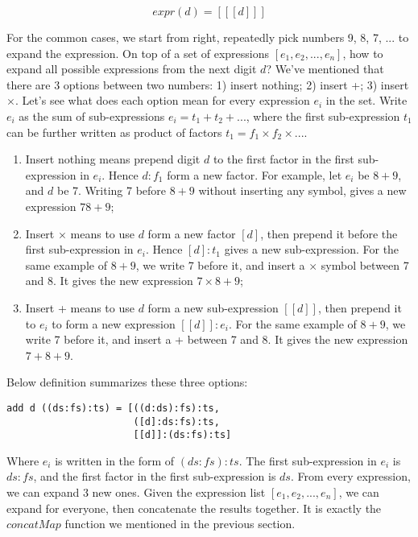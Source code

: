 \documentclass{article}
\begin{document}
\[
expr(d) = [[[d]]]
\]

For the common cases, we start from right, repeatedly pick numbers 9, 8, 7, ... to expand the expression. On top of a set of expressions $[e_1, e_2, ..., e_n]$, how to expand all possible expressions from the next digit $d$? We've mentioned that there are 3 options between two numbers: 1) insert nothing; 2) insert +; 3) insert $\times$. Let's see what does each option mean for every expression $e_i$ in the set. Write $e_i$ as the sum of sub-expressions $e_i = t_1 + t_2 + ...$, where the first sub-expression $t_1$ can be further written as product of factors $t_1 = f_1 \times f_2 \times ...$.

\begin{enumerate}
\item Insert nothing means prepend digit $d$ to the first factor in the first sub-expression in $e_i$. Hence $d:f_1$ form a new factor. For example, let $e_i$ be $8 + 9$, and $d$ be 7. Writing 7 before $8 + 9$ without inserting any symbol, gives a new expression $78 + 9$;

\item Insert $\times$ means to use $d$ form a new factor $[d]$, then prepend it before the first sub-expression in $e_i$. Hence $[d]:t_1$ gives a new sub-expression. For the same example of $8 + 9$, we write 7 before it, and insert a $\times$ symbol between 7 and 8. It gives the new expression $7 \times 8 + 9$;

\item Insert + means to use $d$ form a new sub-expression $[[d]]$, then prepend it to $e_i$ to form a new expression $[[d]]:e_i$. For the same example of $8 + 9$, we write 7 before it, and insert a + between 7 and 8. It gives the new expression $7 + 8 + 9$.
\end{enumerate}

Below definition summarizes these three options:

\lstset{frame = none}
\begin{lstlisting}
add d ((ds:fs):ts) = [((d:ds):fs):ts,
                      ([d]:ds:fs):ts,
                      [[d]]:(ds:fs):ts]
\end{lstlisting}

Where $e_i$ is written in the form of $(ds:fs):ts$. The first sub-expression in $e_i$ is $ds:fs$, and the first factor in the first sub-expression is $ds$. From every expression, we can expand 3 new ones. Given the expression list $[e_1, e_2, ..., e_n]$, we can expand for everyone, then concatenate the results together. It is exactly the $concatMap$ function we mentioned in the previous section.
\end{document}
